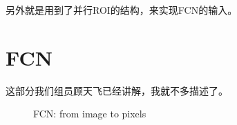 \documentclass[a4paper,12pt]{report}
\begin{document}
\begin{spacing}{1.5}
另外就是用到了并行ROI的结构，来实现FCN的输入。

\section{FCN}
这部分我们组员顾天飞已经讲解，我就不多描述了。
\begin{figure}[!h]

	\centering                                             %
	\caption{FCN: from image to pixels} 
	\label{fig:9}                                          %

\end{figure}

\end{spacing}
\end{document}
